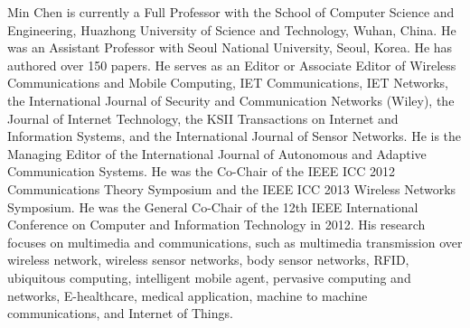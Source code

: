 \documentclass[journal]{IEEEtran}
\begin{document}
\begin{IEEEbiography}{Min Chen}
is currently a Full Professor with the School of Computer Science and Engineering, Huazhong University of Science and Technology, Wuhan, China. He was an Assistant Professor with Seoul National University, Seoul, Korea. He has authored over 150 papers. He serves as an Editor or Associate Editor of Wireless Communications and Mobile Computing, IET Communications, IET Networks, the International Journal of Security and Communication Networks (Wiley), the Journal of Internet Technology, the KSII Transactions on Internet and Information Systems, and the International Journal of Sensor Networks. He is the Managing Editor of the International Journal of Autonomous and Adaptive Communication Systems. He was the Co-Chair of the IEEE ICC 2012 Communications Theory Symposium and the IEEE ICC 2013 Wireless Networks Symposium. He was the General Co-Chair of the 12th IEEE International Conference on Computer and Information Technology in 2012. His research focuses on multimedia and communications, such as multimedia transmission over wireless network, wireless sensor networks, body sensor networks, RFID, ubiquitous computing, intelligent mobile agent, pervasive computing and networks, E-healthcare, medical application, machine to machine communications, and Internet of Things.
\end{IEEEbiography}
\end{document}
